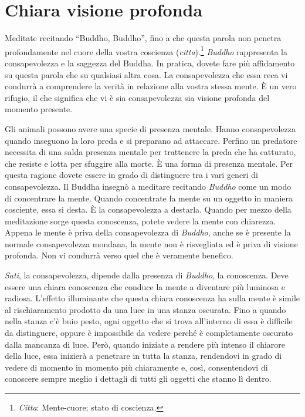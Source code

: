 \chapter{Chiara visione profonda}

Meditate recitando ``Buddho, Buddho'', fino a che questa parola non
penetra profondamente nel cuore della vostra coscienza
(\emph{citta}).\footnote{\emph{Citta}: Mente-cuore; stato di coscienza.}
\emph{Buddho} rappresenta la consapevolezza e la saggezza del Buddha. In
pratica, dovete fare più affidamento su questa parola che su qualsiasi
altra cosa. La consapevolezza che essa reca vi condurrà a comprendere la
verità in relazione alla vostra stessa mente. È un vero rifugio, il che
significa che vi è sia consapevolezza sia visione profonda del momento
presente.

Gli animali possono avere una specie di presenza mentale. Hanno
consapevolezza quando inseguono la loro preda e si preparano ad
attaccare. Perfino un predatore necessita di una salda presenza mentale
per trattenere la preda che ha catturato, che resiste e lotta per
sfuggire alla morte. È una forma di presenza mentale. Per questa ragione
dovete essere in grado di distinguere tra i vari generi di
consapevolezza. Il Buddha insegnò a meditare recitando \emph{Buddho}
come un modo di concentrare la mente. Quando concentrate la mente su un
oggetto in maniera cosciente, essa si desta. È la consapevolezza a
destarla. Quando per mezzo della meditazione sorge questa conoscenza,
potete vedere la mente con chiarezza. Appena le mente è priva della
consapevolezza di \emph{Buddho}, anche se è presente la normale
consapevolezza mondana, la mente non è risvegliata ed è priva di visione
profonda. Non vi condurrà verso quel che è veramente benefico.

\emph{Sati}, la consapevolezza, dipende dalla presenza di \emph{Buddho},
la conoscenza. Deve essere una chiara conoscenza che conduce la mente a
diventare più luminosa e radiosa. L'effetto illuminante che questa
chiara conoscenza ha sulla mente è simile al rischiaramento prodotto da
una luce in una stanza oscurata. Fino a quando nella stanza c'è buio
pesto, ogni oggetto che si trova all'interno di essa è difficile da
distinguere, oppure è impossibile da vedere perché è completamente
oscurato dalla mancanza di luce. Però, quando iniziate a rendere più
intenso il chiarore della luce, essa inizierà a penetrare in tutta la
stanza, rendendovi in grado di vedere di momento in momento più
chiaramente e, così, consentendovi di conoscere sempre meglio i dettagli
di tutti gli oggetti che stanno lì dentro.

